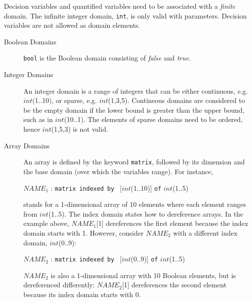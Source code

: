 \documentclass[oneside]{book}
\begin{document}
 Decision variables and quantified
variables need to be associated with a {\em finite} domain. 
The infinite integer domain, {\tt int}, is only valid with parameters. 
Decision variables are not allowed as domain elements.

\begin{description}

\item[Boolean Domains]
 {\tt bool} is the
 Boolean domain consisting of {\em false} and 
{\em true}. 

\item[Integer Domains]
An integer domain is a 
range of integers that can be either continuous,  e.g. $int$(1..10), or
sparse, e.g. $int$(1,3,5). Contineous domains are considered to be the empty 
domain if the lower bound is greater than the upper bound, such as in 
$int$(10..1).
The elements of sparse domains need to be ordered, hence $int$(1,5,3) 
is not valid. %


\item[Array Domains] 
  An array is defined by 
  the keyword {\tt matrix}, followed by its
  dimension and the base domain (over which the variables range).
  For instance,
  \begin{center}
   $NAME_1$ : {\tt matrix indexed by } [$int$(1..10)] {\tt of} $int$(1..5) 
  \end{center}
 stands for a 1-dimensional array of 10 elements where each element
 ranges from  $int$(1..5). The index domain states how to dereference 
 arrays. In the example above, $NAME_1$[1] dereferences the first
 element because the index domain starts with 1. 
 However, consider $NAME_2$ with a different index 
 domain, $int$(0..9):
  \begin{center}
   $NAME_2$ : {\tt matrix indexed by } [$int$(0..9)] {\tt of} $int$(1..5) 
  \end{center}
   $NAME_2$ is also a 1-dimensional array with 10 Boolean elements,
  but is dereferenced differently: $NAME_2$[1] dereferences the second 
  element because its index domain starts with 0.
  






\end{description}
\end{document}
